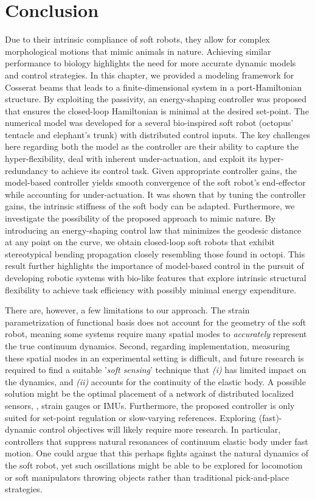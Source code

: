 \vspace{-5mm}
\section{Conclusion}
\label{sec:C3:conclusion}
Due to their intrinsic compliance of soft robots, they allow for complex morphological motions that mimic animals in nature. Achieving similar performance to biology highlights the need for more accurate dynamic models and control strategies. In this chapter, we provided a modeling framework for Cosserat beams that leads to a finite-dimensional system in a port-Hamiltonian structure. By exploiting the passivity, an energy-shaping controller was proposed that ensures the closed-loop Hamiltonian is minimal at the desired set-point. The numerical model was developed for a several bio-inspired soft robot (octopus' tentacle and elephant's trunk) with distributed control inputs. The key challenges here regarding both the model as the controller are their ability to capture the hyper-flexibility, deal with inherent under-actuation, and exploit its hyper-redundancy to achieve its control task. Given appropriate controller gains, the model-based controller yields smooth convergence of the soft robot's end-effector while accounting for under-actuation. It was shown that by tuning the controller gains, the intrinsic stiffness of the soft body can be adapted. Furthermore, we investigate the possibility of the proposed approach to mimic nature. By introducing an energy-shaping control law that minimizes the geodesic distance at any point on the curve, we obtain closed-loop soft robots that exhibit stereotypical bending propagation closely resembling those found in octopi. This result further highlights the importance of model-based control in the pursuit of developing robotic systems with bio-like features that explore intrinsic structural flexibility to achieve task efficiency with possibly minimal energy expenditure.

There are, however, a few limitations to our approach. The strain parametrization of functional basis does not account for the geometry of the soft robot, meaning some systems require many spatial modes to \textit{accurately} represent the true continuum dynamics. Second, regarding implementation, measuring these spatial modes in an experimental setting is difficult, and future research is required to find a suitable '\textit{soft sensing}' technique that  \textit{(i)} has limited impact on the dynamics, and \textit{(ii)} accounts for the continuity of the elastic body. A possible solution might be the optimal placement of a network of distributed localized sensors, \eg, strain gauges or IMUs. Furthermore, the proposed controller is only suited for set-point regulation or slow-varying references. Exploring (fast)-dynamic control objectives will likely require more research. In particular, controllers that suppress natural resonances of continuum elastic body under fast motion. One could argue that this perhaps fights against the natural dynamics of the soft robot, yet such oscillations might be able to be explored for locomotion or soft manipulators throwing objects rather than traditional pick-and-place strategies.


